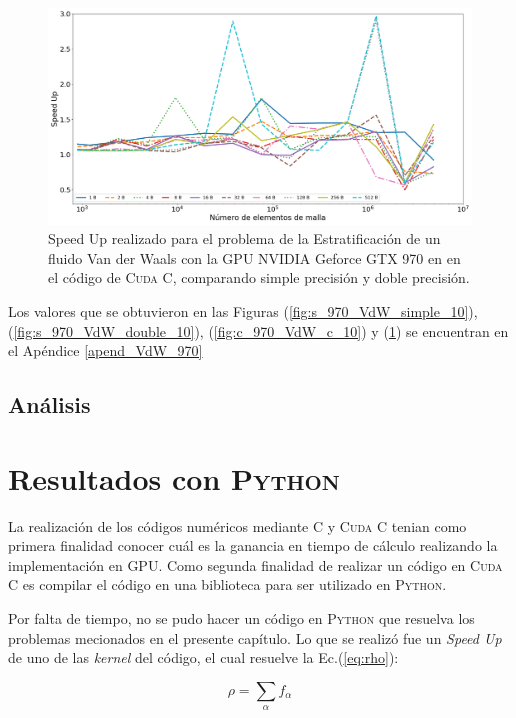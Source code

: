 \begin{figure}[h!]
	\centering
	\includegraphics[width=\textwidth]{figs/cap4/c_970_VdW_cuda_10}
	\caption{Speed Up realizado para el problema de la Estratificación de un fluido Van der Waals con la GPU NVIDIA Geforce GTX 970 en en el código de \textsc{Cuda C}, comparando simple precisión y doble precisión.} 
	\label{fig:c_970_VdW_cuda_10}	
\end{figure}

Los valores que se obtuvieron en las Figuras (\ref{fig:s_970_VdW_simple_10}), (\ref{fig:s_970_VdW_double_10}), (\ref{fig:c_970_VdW_c_10}) y (\ref{fig:c_970_VdW_cuda_10}) se encuentran en el Apéndice \ref{apend_VdW_970}

\subsection{Análisis}


\section{Resultados con \textsc{Python}}

La realización de los códigos numéricos mediante \textsc{C} y \textsc{Cuda C} tenian como primera finalidad conocer cuál es la ganancia en tiempo de cálculo realizando la implementación en GPU. Como segunda finalidad de realizar un código en \textsc{Cuda C} es compilar el código en una biblioteca para ser utilizado en \textsc{Python}.

Por falta de tiempo, no se pudo hacer un código en \textsc{Python} que resuelva los problemas mecionados en el presente capítulo. Lo que se realizó fue un \textit{Speed Up} 
de uno de las \textit{kernel} del código, el cual resuelve la Ec.(\ref{eq:rho}):

\begin{equation*}
\rho = \sum_{\alpha} f_{\alpha}
\end{equation*}

